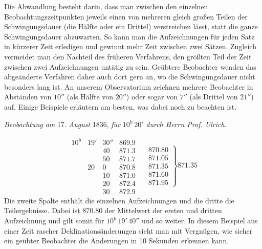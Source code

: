 Die Abwandlung besteht darin, dass man zwischen den einzelnen Beobachtungszeitpunkten jeweils einen von mehreren gleich großen Teilen der Schwingungsdauer (die Hälfte oder ein Drittel) verstreichen lässt, statt die ganze Schwingungsdauer abzuwarten. So kann man die Aufzeichnungen für jeden Satz in kürzerer Zeit erledigen und gewinnt mehr Zeit zwischen zwei Sätzen. Zugleich vermeidet man den Nachteil des früheren Verfahrens, den größten Teil der Zeit zwischen zwei Aufzeichnungen untätig zu sein. Geübtere Beobachter wenden das abgeänderte Verfahren daher auch dort gern an, wo die Schwingungsdauer nicht besonders lang ist. An unserem Observatorium zeichnen mehrere Beobachter in Abständen von $10''$ (als Hälfte von $20''$) oder sogar von $7''$ (als Drittel von $21''$) auf. Einige Beispiele erläutern am besten, was dabei noch zu beachten ist.

\begin{center}\textit{Beobachtung am} 17. \textit{August} 1836, \textit{für} $10^{\mathrm h}\,20'$ \textit{durch Herrn Prof. Ulrich.}\end{center}
\[
\begin{array}{rrr|r|}
10^{\mathrm h}&19'&30''&869.9\\
&&40&871.3\\
&&50&871.7\\
&20&0&870.8\\
&&10&871.0\\
&&20&872.4\\
&&30&872.9
\end{array}\quad
\left.\begin{array}{r}870.80\\871.05\\871.35\\871.60\\871.95\end{array}\right\}871.35
\]
Die zweite Spalte enthält die einzelnen Aufzeichnungen und die dritte die Teilergebnisse. Dabei ist $870.80$ der Mittelwert der ersten und dritten Aufzeichnung und gilt somit für $10^{\mathrm h}\,19'\,40''$ und so weiter. In diesem Beispiel aus einer Zeit rascher Deklinationsänderungen sieht man mit Vergnügen, wie sicher ein geübter Beobachter die Änderungen in 10 Sekunden erkennen kann.

